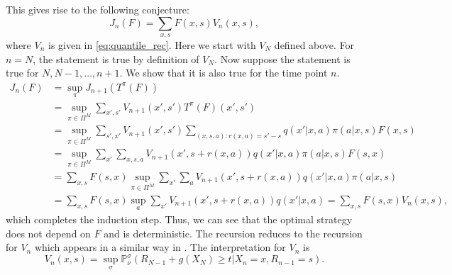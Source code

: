 \documentclass[reqno, 12pt]{amsart}%
\newcommand{\PP}{\mathbb{P}}
\theoremstyle{definition}
\numberwithin{equation}{section} \numberwithin{theorem}{section}
\begin{document}
This gives rise to the following conjecture:
$$ J_n(F)=\sum_{x,s}  F(x,s) V_{n}(x,s),$$
where $V_n$ is given in \eqref{eq:quantile_rec}.
Here we start with $V_N$ defined above.
For $n=N$, the statement is true by
definition of $V_N.$ Now suppose the 
statement is true for $N,N-1,\ldots,n+1.$ 
We show that it is also true for the time 
point $n.$
\begin{align*}
J_n(F)&= \sup_\pi J_{n+1}(T^\pi(F)) \\
&=  \sup_{\pi\in\Pi^M} \sum_{x',s'}  V_{n+1}(x',s')  
T^\pi(F)(x',s') \\
&=  \sup_{\pi\in\Pi^M} \sum_{s',x'}  V_{n+1}(x',s') 
\sum_{(x,s,a) :  r(x,a)=s'-s}  q(x'|x,a) 
\pi(a|x,s) F(x,s)\\
&=  \sup_{\pi\in \Pi^M}   \sum_{x'} 
\sum_{x,s,a} V_{n+1}(x',s+r(x,a))q(x'|x,a)
\pi(a|x,s) F(s,x)\\
&=  \sum_{x,s} F(s,x) \sup_{\pi\in \Pi^M}   
\sum_{x'}\sum_a  V_{n+1}(x',s+r(x,a))   
q(x'|x,a)  \pi(a|x,s) \\
&=  \sum_{x,s} F(s,x) \sup_{a}   \sum_{x'} 
V_{n+1}(x',s+r(x,a))    q(x'|x,a) = 
\sum_{x,s} F(s,x) V_{n}(x,s),
\end{align*}
which completes the induction step. Thus, 
we can see that the optimal strategy does not depend on $F$ and is deterministic. The 
recursion reduces to the recursion for 
$V_n$ which appears in a similar way in 
\cite{wu1999minimizing,bauerle2011markov}. 
The interpretation for $V_n$ is 
$$ V_n(x,s)= \sup_\sigma 
\PP^\sigma_\nu(R_{N-1}+g(X_N)\ge t| X_n=x, 
R_{n-1}=s).$$
\end{document}
